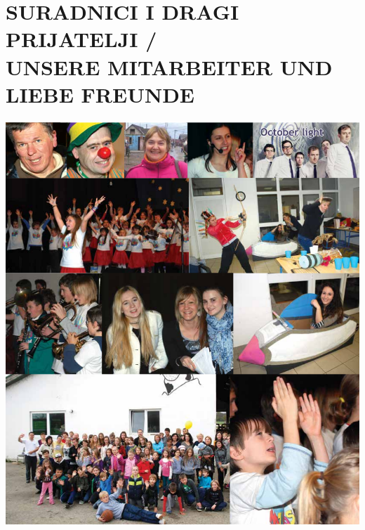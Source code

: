 \documentclass[a4paper,twoside, svgnames]{article}
\begin{document}
\newpage

\section*{SURADNICI I DRAGI PRIJATELJI /\\ UNSERE MITARBEITER UND LIEBE FREUNDE}
\begin{center}
\vspace{1cm}
\includegraphics[width=1\linewidth]{images/suradnici}\\
\end{center}
\end{document}
